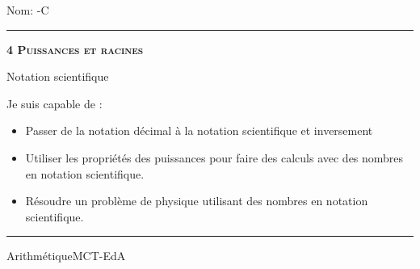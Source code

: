 \documentclass[11pt,a4paper]{article}
\begin{document}
\begin{titlepage}
    \setlength{\topskip}{0mm}
Nom: \hfill \the\year-C
\vspace{0.5cm}
\hrule

    \centering
    \vspace{0.1\textheight}
	{\bfseries\scshape\Huge 4 Puissances et racines\par}
    \vspace{1.5cm}

    {\huge Notation scientifique}
	\vspace{1.5cm}
    
    {\large Je suis capable de :}
    \vspace{1.5cm}
    \begin{itemize}
\item Passer de la notation décimal à la notation scientifique et inversement
\item Utiliser les propriétés des puissances pour faire des calculs avec des nombres en notation scientifique.
\item Résoudre un problème de physique utilisant des nombres en notation scientifique.\end{itemize}

\vfill
\hrule
\vspace{0.5cm}
Arithmétique\hfill MCT-EdA

\end{titlepage}
\end{document}
